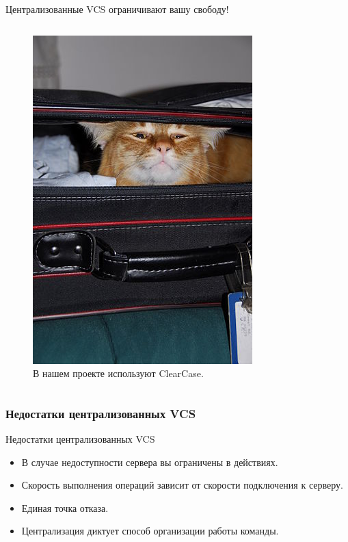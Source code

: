 \documentclass[presentation]{beamer}
\begin{document}
\begin{frame}{Централизованные VCS ограничивают вашу свободу!}
\begin{columns}
\begin{column}{0.5\textwidth}
\begin{figure}[htb]
        \includegraphics[width=.8\textwidth]{packing-for-a-trip}
        \caption{В нашем проекте используют ClearCase.}
      \end{figure}
    \end{column}
  \end{columns}
\end{frame}


\subsubsection{Недостатки централизованных VCS}

\begin{frame}{Недостатки централизованных VCS}
  \begin{itemize}
  \item В случае недоступности сервера вы ограничены в действиях.
  \item Скорость выполнения операций зависит от скорости подключения к
    серверу.
  \item Единая точка отказа.
  \item Централизация диктует способ организации работы команды.
  \end{itemize}
\end{frame}
\end{document}
